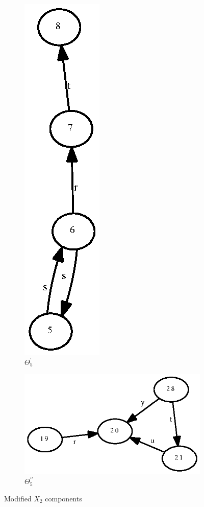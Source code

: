 \documentclass[a4paper,12pt]{article}
\numberwithin{equation}{section}
\numberwithin{figure}{section}
\begin{document}
\begin{figure}
\begin{center}
\begin{subfigure}[b]{.3\columnwidth}
\includegraphics[scale=0.5, angle=90, bb=0 0  82 280]{python/ex_K_i4.eps}
\caption{$\Theta_5^\prime$}
\label{fig:KY15}
\end{subfigure}
\hspace*{2cm}
\begin{subfigure}[b]{.3\columnwidth}
\includegraphics[scale=0.5, angle=90, bb=0 0 82 210]{python/ex_K_j4.eps}
\caption{$\Theta_5^{\prime\prime}$}
\label{fig:KY25}
\end{subfigure}
\end{center}
\caption{Modified $X_2$ components}
\label{fig:KY5}
\end{figure}
\end{document}
